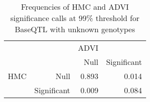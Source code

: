 \begin{table}[ht]
\centering
\caption{Frequencies of HMC and ADVI significance calls at 99\% threshold for BaseQTL with unknown genotypes} 
\label{tab:noGT-xtab-prop-99}
\begin{tabular}{rr|rr}
   &  & ADVI &  \\ 
    &   & Null & Significant \\ 
   \hline
HMC & Null & 0.893 & 0.014 \\ 
    & Significant & 0.009 & 0.084 \\ 
  \end{tabular}
\end{table}

